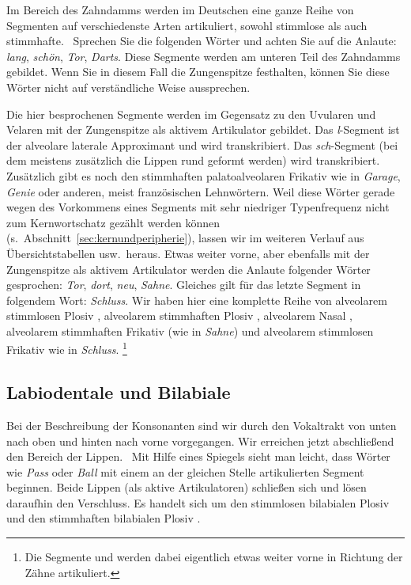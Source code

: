 \label{sec:palatoalveolarealveolare}


Im Bereich des Zahndamms werden im Deutschen eine ganze Reihe von Segmenten auf verschiedenste Arten artikuliert, sowohl stimmlose als auch stimmhafte.
\TuBegin~Sprechen Sie die folgenden Wörter und achten Sie auf die Anlaute: \textit{lang}, \textit{schön}, \textit{Tor}, \textit{Darts}.
Diese Segmente werden am unteren Teil des Zahndamms gebildet.
Wenn Sie in diesem Fall die Zungenspitze festhalten, können Sie diese Wörter nicht auf verständliche Weise aussprechen.

Die hier besprochenen Segmente werden im Gegensatz zu den Uvularen und Velaren mit der Zungenspitze als aktivem Artikulator gebildet.
Das \textit{l}-Segment ist der alveolare laterale Approximant und wird \textipa{[l]} transkribiert.
Das \textit{sch}-Segment (bei dem meistens zusätzlich die Lippen rund geformt werden) wird \textipa{[S]} transkribiert.
Zusätzlich gibt es noch den stimmhaften palatoalveolaren Frikativ \textipa{[Z]} wie in \textit{Garage}, \textit{Genie} oder anderen, meist französischen Lehnwörtern.
Weil diese Wörter gerade wegen des Vorkommens eines Segments mit sehr niedriger Typenfrequenz nicht zum Kernwortschatz gezählt werden können (s.\ Abschnitt~\ref{sec:kernundperipherie}), lassen wir \textipa{[Z]} im weiteren Verlauf aus Übersichtstabellen usw.\ heraus.
Etwas weiter vorne, aber ebenfalls mit der Zungenspitze als aktivem Artikulator werden die Anlaute folgender Wörter gesprochen: \textit{Tor}, \textit{dort}, \textit{neu}, \textit{Sahne}.
Gleiches gilt für das letzte Segment in folgendem Wort: \textit{Schluss}.
Wir haben hier eine komplette Reihe von alveolarem stimmlosen Plosiv \textipa{[t]}, alveolarem stimmhaften Plosiv \textipa{[d]}, alveolarem Nasal \textipa{[n]}, alveolarem stimmhaften Frikativ \textipa{[z]} (wie in \textit{Sahne}) und alveolarem stimmlosen Frikativ \textipa{[s]} wie in \textit{Schluss}.%
\footnote{Die Segmente \textipa{[s]} und \textipa{[z]} werden dabei eigentlich etwas weiter vorne in Richtung der Zähne artikuliert.}

\subsection{Labiodentale und Bilabiale}


Bei der Beschreibung der Konsonanten sind wir durch den Vokaltrakt von unten nach oben und hinten nach vorne vorgegangen.
Wir erreichen jetzt abschließend den Bereich der Lippen.
\TuBegin~Mit Hilfe eines Spiegels sieht man leicht, dass Wörter wie \textit{Pass} oder \textit{Ball} mit einem an der gleichen Stelle artikulierten Segment beginnen.
Beide Lippen (als aktive Artikulatoren) schließen sich und lösen daraufhin den Verschluss.
Es handelt sich um den stimmlosen bilabialen Plosiv \textipa{[p]} und den stimmhaften bilabialen Plosiv \textipa{[b]}.

